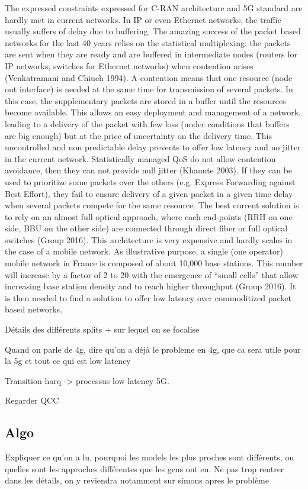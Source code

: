 \documentclass[a4paper,10pt]{article}
\begin{document}
 
The expressed constraints expressed for C-RAN architecture and 5G standard are hardly met in current networks. In IP or even Ethernet networks, the traffic usually suffers of delay due to buffering. The amazing success of the packet based networks for the last 40 years relies on the statistical multiplexing: the packets are sent when they are ready and are buffered in intermediate nodes (routers for IP networks, switches for Ethernet networks) when contention arises (Venkatramani and Chiueh 1994). A contention means that one resource (node out interface) is needed at the same time for transmission of several packets. In this case, the supplementary packets are stored in a buffer until the resources become available. This allows an easy deployment and management of a network, leading to a delivery of the packet with few loss (under conditions that buffers are big enough) but at the price of uncertainty on the delivery time. This uncontrolled and non predictable delay prevents to offer low latency and no jitter in the current network. Statistically managed QoS do not allow contention avoidance, then they can not provide null jitter (Khaunte 2003). If they can be used to prioritize some packets over the others (e.g. Express Forwarding against Best Effort), they fail to ensure delivery of a given packet in a given time delay when several packets compete for the same resource. 
The best current solution is to rely on an almost full optical approach, where each end-points (RRH on one side, BBU on the other side) are connected through direct fiber or full optical switches (Group 2016). This architecture is very expensive and hardly scales in the case of a mobile network. As illustrative purpose, a single (one operator) mobile network in France is composed of about 10,000 base stations. This number will increase by a factor of 2 to 20 with the emergence of “small cells” that allow increasing base station density and to reach higher throughput (Group 2016). It is then needed to find a solution to offer low latency over commoditized packet based networks. 

 

Détails des différents splits + sur lequel on se focalise 

 

Quand on parle de 4g, dire qu’on a déjà le probleme en 4g, que ca sera utile pour la 5g et tout ce qui est low latency 

Transition harq -> processus low latency 5G. 

Regarder QCC 
\subsection{Algo}
Expliquer ce qu'on a lu, pourquoi les models les plus proches sont différents, ou quelles sont les approches différentes que les gens ont eu. Ne pas trop rentrer dans les détails, on y reviendra notamment sur simons apres le problème
\end{document}
